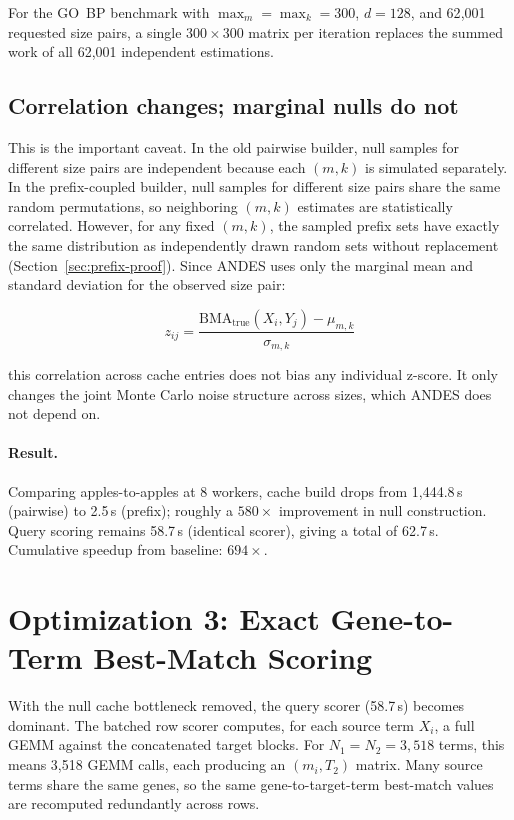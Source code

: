 \documentclass[11pt,a4paper]{article}
\begin{document}
For the GO~BP benchmark with $\max_m = \max_k = 300$, $d = 128$, and 62{,}001
requested size pairs, a single $300 \times 300$ matrix per iteration replaces
the summed work of all 62{,}001 independent estimations.

\subsection{Correlation changes; marginal nulls do not}

This is the important caveat. In the old pairwise builder, null samples for
different size pairs are independent because each $(m,k)$ is simulated
separately. In the prefix-coupled builder, null samples for different size
pairs share the same random permutations, so neighboring $(m,k)$ estimates
are statistically correlated. However, for any fixed $(m,k)$, the sampled
prefix sets have exactly the same distribution as independently drawn random
sets without replacement (Section~\ref{sec:prefix-proof}). Since ANDES uses only the marginal
mean and standard deviation for the observed size pair:

\[
	z_{ij} = \frac{\mathrm{BMA}_\text{true}(X_i, Y_j) - \mu_{m,k}}{\sigma_{m,k}}
\]

this correlation across cache entries does not bias any individual z-score.
It only changes the joint Monte Carlo noise structure across sizes, which
ANDES does not depend on.

\paragraph{Result.}
Comparing apples-to-apples at 8 workers, cache build drops from 1{,}444.8\,s
(pairwise) to 2.5\,s (prefix); roughly a $580\times$ improvement in null
construction. Query scoring remains 58.7\,s (identical scorer), giving a
total of 62.7\,s. Cumulative speedup from baseline: $694\times$.

\section{Optimization 3: Exact Gene-to-Term Best-Match Scoring}

With the null cache bottleneck removed, the query scorer (58.7\,s) becomes
dominant. The batched row scorer computes, for each source term $X_i$, a full
GEMM against the concatenated target blocks. For $N_1 = N_2 = 3{,}518$ terms,
this means 3{,}518 GEMM calls, each producing an $(m_i, T_2)$ matrix. Many
source terms share the same genes, so the same gene-to-target-term best-match
values are recomputed redundantly across rows.
\end{document}
